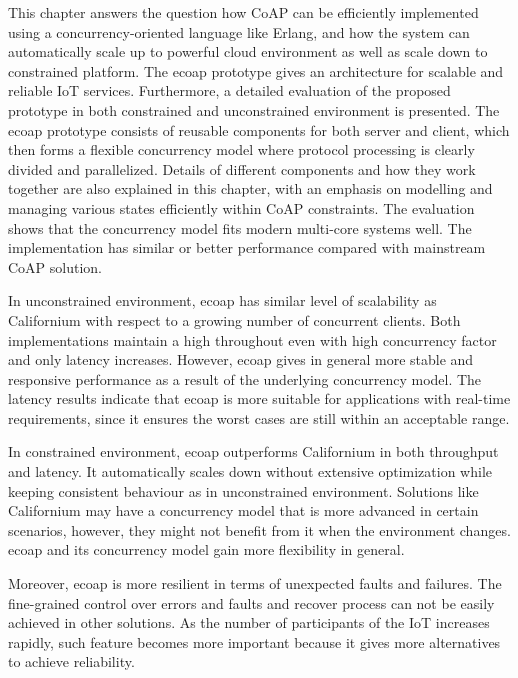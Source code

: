 This chapter answers the question how CoAP can be efficiently implemented using a concurrency-oriented language like Erlang, and how the system can automatically scale up to powerful cloud environment as well as scale down to constrained platform. The ecoap prototype gives an architecture for scalable and reliable IoT services. Furthermore, a detailed evaluation of the proposed prototype in both constrained and unconstrained environment is presented. The ecoap prototype consists of reusable components for both server and client, which then forms a flexible concurrency model where protocol processing is clearly divided and parallelized. Details of different components and how they work together are also explained in this chapter, with an emphasis on modelling and managing various states efficiently within CoAP constraints. The evaluation shows that the concurrency model fits modern multi-core systems well. The implementation has similar or better performance compared with mainstream CoAP solution. 

In unconstrained environment, ecoap has similar level of scalability as Californium with respect to a growing number of concurrent clients. Both implementations maintain a high throughout even with high concurrency factor and only latency increases. However, ecoap gives in general more stable and responsive performance as a result of the underlying concurrency model. The latency results indicate that ecoap is more suitable for applications with real-time requirements, since it ensures the worst cases are still within an acceptable range. 

In constrained environment, ecoap outperforms Californium in both throughput and latency. It automatically scales down without extensive optimization while keeping consistent behaviour as in unconstrained environment. Solutions like Californium may have a concurrency model that is more advanced in certain scenarios, however, they might not benefit from it when the environment changes. ecoap and its concurrency model gain more flexibility in general.

Moreover, ecoap is more resilient in terms of unexpected faults and failures. The fine-grained control over errors and faults and recover process can not be easily achieved in other solutions. 
As the number of participants of the IoT increases rapidly, such feature becomes more important because it gives more alternatives to achieve reliability. 



